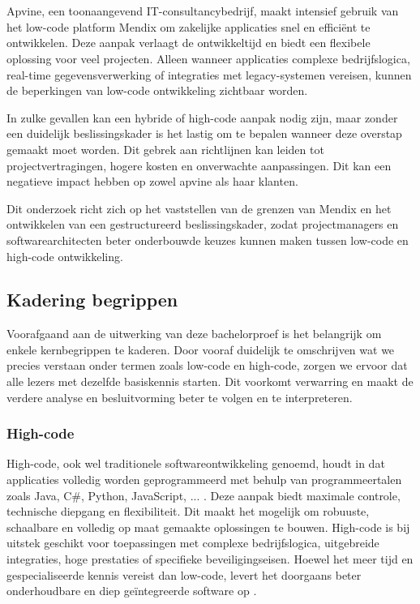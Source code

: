 
\chapter{}%
\label{ch:inleiding}

Apvine, een toonaangevend IT-consultancybedrijf, maakt intensief gebruik van het low-code platform Mendix om zakelijke applicaties snel en efficiënt te ontwikkelen. Deze aanpak verlaagt de ontwikkeltijd en biedt een flexibele oplossing voor veel projecten. Alleen wanneer applicaties complexe bedrijfslogica, real-time gegevensverwerking of integraties met legacy-systemen vereisen, kunnen de beperkingen van low-code ontwikkeling zichtbaar worden.

In zulke gevallen kan een hybride of high-code aanpak nodig zijn, maar zonder een duidelijk beslissingskader is het lastig om te bepalen wanneer deze overstap gemaakt moet worden. Dit gebrek aan richtlijnen kan leiden tot projectvertragingen, hogere kosten en onverwachte aanpassingen. Dit kan een negatieve impact hebben op zowel apvine als haar klanten.

Dit onderzoek richt zich op het vaststellen van de grenzen van Mendix en het ontwikkelen van een gestructureerd beslissingskader, zodat projectmanagers en softwarearchitecten beter onderbouwde keuzes kunnen maken tussen low-code en high-code ontwikkeling.

\section{Kadering begrippen}
Voorafgaand aan de uitwerking van deze bachelorproef is het belangrijk om enkele kernbegrippen te kaderen. Door vooraf duidelijk te omschrijven wat we precies verstaan onder termen zoals low-code en high-code, zorgen we ervoor dat alle lezers met dezelfde basiskennis starten. Dit voorkomt verwarring en maakt de verdere analyse en besluitvorming beter te volgen en te interpreteren.
\subsection{High-code}
High-code, ook wel traditionele softwareontwikkeling genoemd, houdt in dat applicaties volledig worden geprogrammeerd met behulp van programmeertalen zoals Java, C\#, Python, JavaScript, ... . Deze aanpak biedt maximale controle, technische diepgang en flexibiliteit. Dit maakt het mogelijk om robuuste, schaalbare en volledig op maat gemaakte oplossingen te bouwen. High-code is bij uitstek geschikt voor toepassingen met complexe bedrijfslogica, uitgebreide integraties, hoge prestaties of specifieke beveiligingseisen. Hoewel het meer tijd en gespecialiseerde kennis vereist dan low-code, levert het doorgaans beter onderhoudbare en diep geïntegreerde software op
\textcite{Northcutt2023}.
